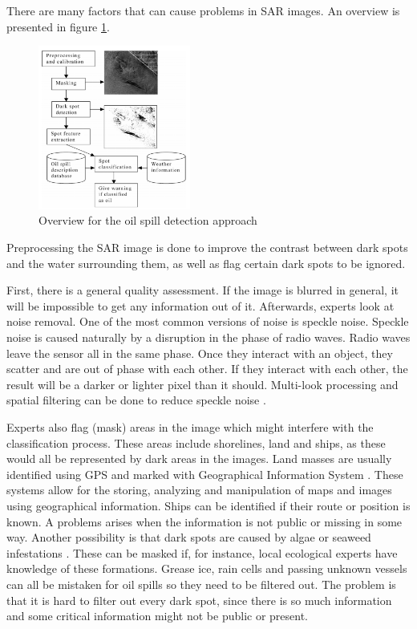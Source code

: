 There are many factors that can cause problems in SAR images. An overview is presented in figure \ref{fig:overview}.
\begin{figure}[H]
	\centering
    \includegraphics[width=50mm,scale=0.3]{./img/detection_diagram.png}
    \caption{\footnotesize{Overview for the oil spill detection approach \cite{Solberg200745}}}
    \label{fig:overview}
\end{figure}
Preprocessing the SAR image is done to improve the contrast between dark spots and the water surrounding them, as well as flag certain dark spots to be ignored. 

First, there is a general quality assessment. If the image is blurred in general, it will be impossible to get any information out of it. Afterwards, experts look at noise removal. One of the most common versions of noise is speckle noise. Speckle noise is caused naturally by a disruption in the phase of radio waves. Radio waves leave the sensor all in the same phase. Once they interact with an object, they scatter and are out of phase with each other. If they interact with each other, the result will be a darker or lighter pixel than it should. Multi-look processing and spatial filtering can be done to reduce speckle noise \cite{simard1998analysis}.

Experts also flag (mask) areas in the image which might interfere with the classification process. These areas include shorelines, land and ships, as these would all be represented by dark areas in the images. Land masses are usually identified using GPS and marked with Geographical Information System \cite{star1990geographic}. These systems allow for the storing, analyzing and manipulation of maps and images using geographical information. Ships can be identified if their route or position is known. A problems arises when the information is not public or missing in some way.
Another possibility is that dark spots are caused by algae or seaweed infestations \cite{fingas2014review}. These can be masked if, for instance, local ecological experts have knowledge of these formations. Grease ice, rain cells and passing unknown vessels can all be mistaken for oil spills \cite{Brekke200595} so they need to be filtered out. The problem is that it is hard to filter out every dark spot, since there is so much information and some critical information might not be public or present.

